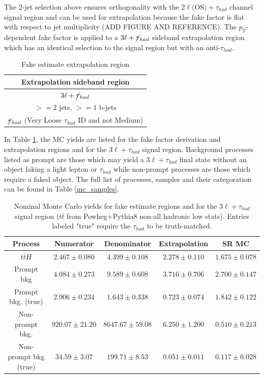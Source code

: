 \documentclass[11pt]{article}
\begin{document}
	The 2-jet selection above ensures orthogonality with the $2\ell \text{(OS)}+\tau_{had}$ channel signal region and can be used for extrapolation because the fake factor is flat with respect to jet multiplicity (ADD FIGURE AND REFERENCE). The $p_T$-dependent fake factor is applied to a $3\ell+\cancel{\tau}_{had}$ sideband extrapolation region which has an identical selection to the signal region but with an anti-$\tau_{had}$. 
	
	\begin{table}[htp]
		\caption{Fake estimate extrapolation region} 
		\begin{center}
			\begin{tabular}{|c|}
			\hline
			Extrapolation sideband region	\\
			\hline
			$3\ell+\cancel{\tau}_{had}$ 	\\
			$>=2$ jets, $>=1$ b-jets	\\
			$\cancel{\tau}_{had}$ (Very Loose $\tau_{had}$ ID and not Medium) \\
			\hline
			\end{tabular}
		\end{center}
	\end{table}%
	
	In Table \ref{yields}, the MC yields are listed for the fake factor derivation and extrapolation regions and for the $3\ell+\tau_{had}$ signal region. Background processes listed as prompt are those which may yield a $3\ell+\tau_{had}$ final state without an object faking a light lepton or $\tau_{had}$ while non-prompt processes are those which require a faked object. The full list of processes, samples and their categoration can be found in Table \ref{mc_samples}. 
	
	\begin{table}[htp]
		\caption{Nominal Monte Carlo yields for fake estimate regions and for the $3\ell+\tau_{had}$ signal region ($t\bar{t}$ from Powheg+Pythia8 non-all hadronic low stats). Entries labeled "true" require the $\tau_{had}$ to be truth-matched.  }
		\begin{center}
			\begin{tabular}{|c|c|c|c|c|}
			\hline
			Process				& Numerator 			& Denominator 		& Extrapolation 			& SR MC \\
			\hline
			$t\bar{t}H$			& $2.467\pm0.080$	& $4.399\pm0.108$	& $2.278\pm0.110$		& $1.675\pm0.078$\\
			Prompt bkg			& $4.084\pm0.273$	& $9.589\pm0.608$	& $3.716\pm0.706$		& $2.700\pm0.147$\\
			Prompt bkg. (true)		& $2.906\pm0.234$	& $1.643\pm0.338$	& $0.723\pm0.074$		& $1.842\pm0.122$\\
			Non-prompt bkg.		& $920.07\pm21.20$	& $8647.67\pm59.08$	& $6.250\pm1.200$		& $0.510\pm0.213$\\
			Non-prompt bkg (true)	& $34.59\pm3.07$		& $199.71\pm8.53$	& $0.051\pm0.011$		& $0.117\pm0.028$\\
			\hline
			\end{tabular}
		\end{center}
		\label{yields}
	\end{table}%
	
\end{document}
